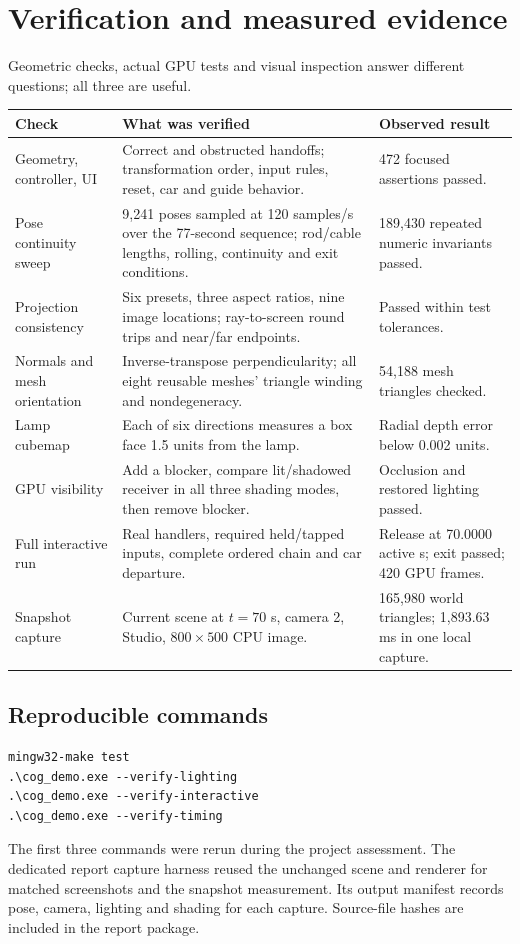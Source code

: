 \documentclass[a4paper,10pt]{article}
\newcommand{\lead}[1]{{\sffamily\color{muted}\normalsize #1\par}\vspace{3pt}}
\newcommand{\reportpage}[2]{\newpage\section{#1}\label{section:\thesection}\lead{#2}}
\numberwithin{equation}{section}
\begin{document}
\reportpage{Verification and measured evidence}{Geometric checks, actual GPU tests and visual inspection answer different questions; all three are useful.}
\par\noindent\begin{tabularx}{\linewidth}{@{}p{35mm}Y p{28mm}@{}}
\toprule
\textbf{Check} & \textbf{What was verified} & \textbf{Observed result}\\\midrule
Geometry, controller, UI & Correct and obstructed handoffs; transformation order, input rules, reset, car and guide behavior. & 472 focused assertions passed.\\
Pose continuity sweep & 9,241 poses sampled at 120 samples/s over the 77-second sequence; rod/cable lengths, rolling, continuity and exit conditions. & 189,430 repeated numeric invariants passed.\\
Projection consistency & Six presets, three aspect ratios, nine image locations; ray-to-screen round trips and near/far endpoints. & Passed within test tolerances.\\
Normals and mesh orientation & Inverse-transpose perpendicularity; all eight reusable meshes' triangle winding and nondegeneracy. & 54,188 mesh triangles checked.\\
Lamp cubemap & Each of six directions measures a box face 1.5 units from the lamp. & Radial depth error below 0.002 units.\\
GPU visibility & Add a blocker, compare lit/shadowed receiver in all three shading modes, then remove blocker. & Occlusion and restored lighting passed.\\
Full interactive run & Real handlers, required held/tapped inputs, complete ordered chain and car departure. & Release at 70.0000 active s; exit passed; 420 GPU frames.\\
Snapshot capture & Current scene at $t=70$ s, camera 2, Studio, $800\times500$ CPU image. & 165,980 world triangles; 1,893.63 ms in one local capture.\\
\bottomrule
\end{tabularx}\par
\subsection*{Reproducible commands}
\begin{lstlisting}
mingw32-make test
.\cog_demo.exe --verify-lighting
.\cog_demo.exe --verify-interactive
.\cog_demo.exe --verify-timing
\end{lstlisting}
The first three commands were rerun during the project assessment. The dedicated report capture harness reused the unchanged scene and renderer for matched screenshots and the snapshot measurement. Its output manifest records pose, camera, lighting and shading for each capture. Source-file hashes are included in the report package.
\end{document}
